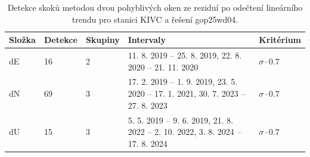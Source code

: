 \begin{table}[H]
\centering
\small
\caption{Detekce skoků metodou dvou pohyblivých oken ze reziduí po odečtení lineárního trendu pro stanici KIVC a řešení gop25wd04.}
\label{tab:gop25wd04_stcd_kivc_detr_weighted_1seg_jumps_sliding_window}
\begin{tabular}{lllll}
\toprule
Složka & Detekce & Skupiny & Intervaly & Kritérium \\
\midrule
dE & 16 & 2 & 11. 8. 2019 -- 25. 8. 2019, 22. 8. 2020 -- 21. 11. 2020 & $\sigma \cdot 0.7$ \\
dN & 69 & 3 & 17. 2. 2019 -- 1. 9. 2019, 23. 5. 2020 -- 17. 1. 2021, 30. 7. 2023 -- 27. 8. 2023 & $\sigma \cdot 0.7$ \\
dU & 15 & 3 & 5. 5. 2019 -- 9. 6. 2019, 21. 8. 2022 -- 2. 10. 2022, 3. 8. 2024 -- 17. 8. 2024 & $\sigma \cdot 0.7$ \\
\bottomrule
\end{tabular}
\end{table}
